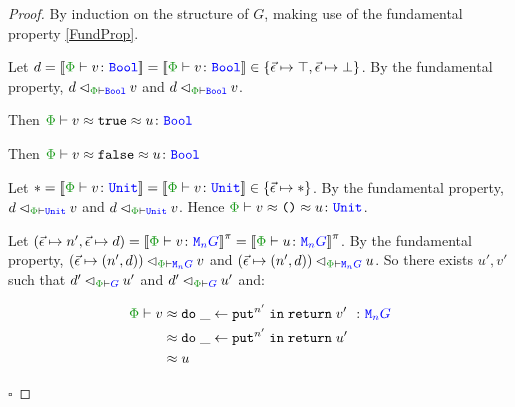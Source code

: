 \documentclass{Report}
\newcommand\eLogRel[4]{\logRel{#2}{\wellformed{#1}{#3}}{#4}}
\newcommand\peLogRel[3]{\eLogRel{\P}{#1}{#2}{#3}}
\newcommand{\zptyperelation}[2]{\typerelation{\P}{#1}{#2}}
\newcommand{\zpberelation}[2]{\berelation{\P}{#1}{#2}}
\newcommand\liftp[0]{^\pi}
\begin{document}
\begin{proof}
    By induction on the structure of $G$, making use of the fundamental property \ref{FundProp}.

    Let $d=\deno{\zptyperelation{v}{\B}}=\deno{\zptyperelation{v}{\B}}\in \{\ev\mapsto \top, \ev\mapsto\bot\}$. By the fundamental property, $\peLogRel{d}{\B}{v}$  and $\peLogRel{d}{\B}{v}$.

    Then $\zpberelation{v\beequiv\t}{u}{\B}$

    
    Then $\zpberelation{v\beequiv\f}{u}{\B}$

    Let $\singleton=\deno{\zptyperelation{v}{\U}}=\deno{\zptyperelation{v}{\U}}\in \{\ev\mapsto\singleton\}$. By the fundamental property, $\peLogRel{d}{\U}{v}$  and $\peLogRel{d}{\U}{v}$. Hence $\zpberelation{v\beequiv\u}{u}{\U}$.


    Let $(\ev\mapsto n', \ev\mapsto d) = \deno{\zptyperelation{v}{\M{n}{G}}}\liftp = \deno{\zptyperelation{u}{\M{n}{G}}}\liftp$. By the fundamental property, $\peLogRel{(\ev\mapsto(n', d))}{\M{n}{G}}{v}$ and $\peLogRel{(\ev\mapsto(n', d))}{\M{n}{G}}{u}$. So there exists $u', v'$ such that $\peLogRel{d'}{G}{u'}$ and $\peLogRel{d'}{G}{u'}$ and:

    \begin{align*}
        \zpberelation{v&}{\doin{\_}{\put^{n'}}{\return{v'}}}{\M{n}{G}}\\
        &\beequiv \doin{\_}{\put^{n'}}{\return{u'}}\\
        & \beequiv u
    \end{align*}

$\square$
\end{proof}
\end{document}
